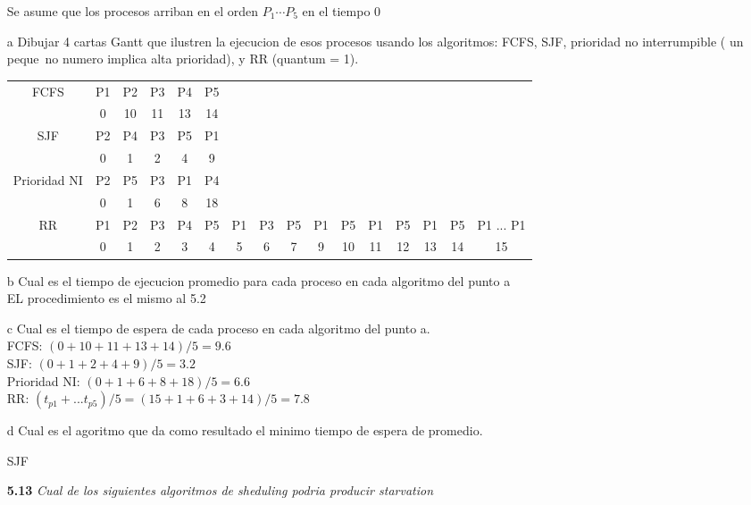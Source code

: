 \begin{itemize}
Se asume que los procesos arriban en el orden $P_1 \cdots P_5$ en el tiempo 0\\

\item[a] Dibujar 4 cartas Gantt que ilustren la ejecucion de esos procesos usando los algoritmos: FCFS, SJF, prioridad no interrumpible ( un peque~no numero implica alta prioridad), y RR (quantum = 1).

\begin{tabular}{|c|c|c|c|c|c|c|c|c|c|c|c|c|c|c|c|}
FCFS	& P1 & P2 & P3 & P4 & P5\\
	& 0 & 10 & 11 & 13 & 14\\\hline
SJF	& P2 & P4 & P3 & P5 & P1\\
	& 0 & 1 & 2 & 4 & 9\\\hline
Prioridad NI & P2 & P5 & P3 & P1 & P4\\
	& 0 & 1 & 6 & 8  & 18\\\hline
RR & P1 & P2 & P3 & P4 & P5 & P1 & P3 & P5 & P1 & P5 & P1 & P5 & P1 & P5 & P1 ... P1\\
   & 0  & 1  & 2  & 3  & 4  & 5  & 6  & 7  & 9  & 10 & 11 & 12 & 13 & 14 & 15\\\hline
\end{tabular}

\item[b] Cual es el tiempo de ejecucion promedio para cada proceso en cada algoritmo del punto a\\

EL procedimiento es el mismo al 5.2\\

\item[c] Cual es el tiempo de espera de cada proceso en cada algoritmo del punto a.\\

FCFS: $(0+10+11+13+14)/5 = 9.6$\\
SJF: $(0+1+2+4+9)/5 = 3.2$\\
Prioridad NI: $(0+1+6+8+18)/5 = 6.6$\\
RR: $(t_{p1} + ... t_{p5})/5 = (15 + 1 + 6 + 3 + 14)/5 = 7.8$\\

\item[d] Cual es el agoritmo que da como resultado el minimo tiempo de espera de promedio.

SJF\\

\item[\textbf{5.13}]\emph{Cual de los siguientes algoritmos de sheduling podria producir starvation}


\end{itemize}
